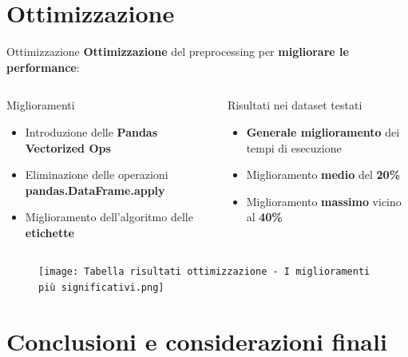 \documentclass{beamer}
\begin{document}
	\section{Ottimizzazione}

	\begin{frame}{Ottimizzazione}
		\textbf{Ottimizzazione} del preprocessing per \textbf{migliorare le performance}:

		\begin{columns}
			\begin{column}{0.5\textwidth}
				\begin{block}{Miglioramenti}
					\begin{itemize}
						\item Introduzione delle \textbf{Pandas Vectorized Ops}
						\item Eliminazione delle operazioni \textbf{pandas.DataFrame.apply}
						\item Miglioramento dell'algoritmo delle \textbf{etichette}
					\end{itemize}
				\end{block}
			\end{column}
			\begin{column}{0.5\textwidth}
				\begin{exampleblock}{Risultati nei dataset testati}
					\begin{itemize}
						\item \textbf{Generale miglioramento} dei tempi di esecuzione
						\item Miglioramento \textbf{medio} del \textbf{20\%}
						\item Miglioramento \textbf{massimo} vicino al \textbf{40\%}
					\end{itemize}
				\end{exampleblock}
			\end{column}
		\end{columns}

		\begin{figure}
			\centering
			\texttt{[image: Tabella risultati ottimizzazione - I miglioramenti più significativi.png]}
		\end{figure}
	\end{frame}


	\section{Conclusioni e considerazioni finali}
\end{document}
